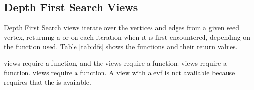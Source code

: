 \subsection{Depth First Search Views}
Depth First Search views iterate over the vertices and edges from a given seed vertex, returning a  or  on each iteration when it is first encountered, depending on the function used. 
Table \ref{tab:dfs} shows the functions and their return values.


 views require a  function, and the  views require a  function.
 views require a  function.  views require a  function. 
A  view with a evf is not available because  requires that the  is available.


